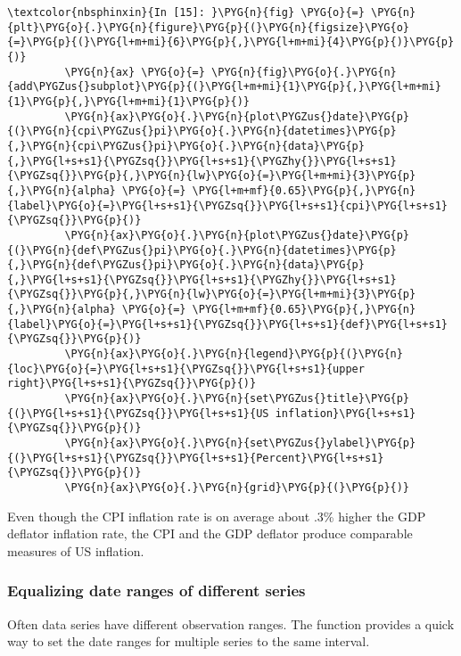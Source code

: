 \documentclass[letterpaper,10pt,openany,oneside,english]{sphinxmanual}
\begin{document}
%
\begin{Verbatim}[commandchars=\\\{\}]
\textcolor{nbsphinxin}{In [15]: }\PYG{n}{fig} \PYG{o}{=} \PYG{n}{plt}\PYG{o}{.}\PYG{n}{figure}\PYG{p}{(}\PYG{n}{figsize}\PYG{o}{=}\PYG{p}{(}\PYG{l+m+mi}{6}\PYG{p}{,}\PYG{l+m+mi}{4}\PYG{p}{)}\PYG{p}{)}
         \PYG{n}{ax} \PYG{o}{=} \PYG{n}{fig}\PYG{o}{.}\PYG{n}{add\PYGZus{}subplot}\PYG{p}{(}\PYG{l+m+mi}{1}\PYG{p}{,}\PYG{l+m+mi}{1}\PYG{p}{,}\PYG{l+m+mi}{1}\PYG{p}{)}
         \PYG{n}{ax}\PYG{o}{.}\PYG{n}{plot\PYGZus{}date}\PYG{p}{(}\PYG{n}{cpi\PYGZus{}pi}\PYG{o}{.}\PYG{n}{datetimes}\PYG{p}{,}\PYG{n}{cpi\PYGZus{}pi}\PYG{o}{.}\PYG{n}{data}\PYG{p}{,}\PYG{l+s+s1}{\PYGZsq{}}\PYG{l+s+s1}{\PYGZhy{}}\PYG{l+s+s1}{\PYGZsq{}}\PYG{p}{,}\PYG{n}{lw}\PYG{o}{=}\PYG{l+m+mi}{3}\PYG{p}{,}\PYG{n}{alpha} \PYG{o}{=} \PYG{l+m+mf}{0.65}\PYG{p}{,}\PYG{n}{label}\PYG{o}{=}\PYG{l+s+s1}{\PYGZsq{}}\PYG{l+s+s1}{cpi}\PYG{l+s+s1}{\PYGZsq{}}\PYG{p}{)}
         \PYG{n}{ax}\PYG{o}{.}\PYG{n}{plot\PYGZus{}date}\PYG{p}{(}\PYG{n}{def\PYGZus{}pi}\PYG{o}{.}\PYG{n}{datetimes}\PYG{p}{,}\PYG{n}{def\PYGZus{}pi}\PYG{o}{.}\PYG{n}{data}\PYG{p}{,}\PYG{l+s+s1}{\PYGZsq{}}\PYG{l+s+s1}{\PYGZhy{}}\PYG{l+s+s1}{\PYGZsq{}}\PYG{p}{,}\PYG{n}{lw}\PYG{o}{=}\PYG{l+m+mi}{3}\PYG{p}{,}\PYG{n}{alpha} \PYG{o}{=} \PYG{l+m+mf}{0.65}\PYG{p}{,}\PYG{n}{label}\PYG{o}{=}\PYG{l+s+s1}{\PYGZsq{}}\PYG{l+s+s1}{def}\PYG{l+s+s1}{\PYGZsq{}}\PYG{p}{)}
         \PYG{n}{ax}\PYG{o}{.}\PYG{n}{legend}\PYG{p}{(}\PYG{n}{loc}\PYG{o}{=}\PYG{l+s+s1}{\PYGZsq{}}\PYG{l+s+s1}{upper right}\PYG{l+s+s1}{\PYGZsq{}}\PYG{p}{)}
         \PYG{n}{ax}\PYG{o}{.}\PYG{n}{set\PYGZus{}title}\PYG{p}{(}\PYG{l+s+s1}{\PYGZsq{}}\PYG{l+s+s1}{US inflation}\PYG{l+s+s1}{\PYGZsq{}}\PYG{p}{)}
         \PYG{n}{ax}\PYG{o}{.}\PYG{n}{set\PYGZus{}ylabel}\PYG{p}{(}\PYG{l+s+s1}{\PYGZsq{}}\PYG{l+s+s1}{Percent}\PYG{l+s+s1}{\PYGZsq{}}\PYG{p}{)}
         \PYG{n}{ax}\PYG{o}{.}\PYG{n}{grid}\PYG{p}{(}\PYG{p}{)}
\end{Verbatim}

\noindent{}

Even though the CPI inflation rate is on average about .3\% higher the
GDP deflator inflation rate, the CPI and the GDP deflator produce
comparable measures of US inflation.


\subsubsection{Equalizing date ranges of different series}
\label{\detokenize{fredpy_examples:Equalizing-date-ranges-of-different-series}}
Often data series have different observation ranges. The {\hyperref[\detokenize{additional_functions:fredpy.window_equalize}]{}} function provides a quick way to set the date ranges for multiple series to the same interval.
\end{document}

